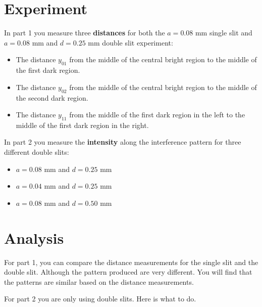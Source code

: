 \section{Experiment}
In part 1 you measure three \textbf{distances} for both the $a = 0.08$ mm single slit and $a = 0.08$ mm and $d = 0.25$ mm double slit experiment:
\begin{itemize}
	\item The distance $y_{01}$ from the middle of the central bright region to the middle of the first dark region.
	\item The distance $y_{02}$ from the middle of the central bright region to the middle of the second dark region.
	\item The distance $y_{11}$ from the middle of the first dark region in the left to the middle of the first dark region in the right.
\end{itemize}
In part 2 you measure the \textbf{intensity} along the interference pattern for three different double slits:
\begin{itemize}
	\item $a = 0.08$ mm and $d = 0.25$ mm
	\item $a = 0.04$ mm and $d = 0.25$ mm
	\item $a = 0.08$ mm and $d = 0.50$ mm
\end{itemize}
\section{Analysis}
For part 1, you can compare the distance measurements for the single slit and the double slit. Although the pattern produced are very different. You will find that the patterns are similar based on the distance measurements.

For part 2 you are only using double slits. Here is what to do.

